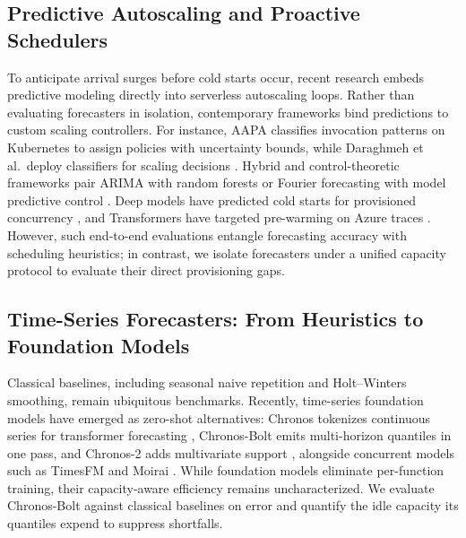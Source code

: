 \documentclass[conference,a4paper]{IEEEtran}
\begin{document}
\subsection{Predictive Autoscaling and Proactive Schedulers}
To anticipate arrival surges before cold starts occur, recent research embeds predictive modeling directly into serverless autoscaling loops. Rather than evaluating forecasters in isolation, contemporary frameworks bind predictions to custom scaling controllers. For instance, AAPA \cite{zhang2025aapa} classifies invocation patterns on Kubernetes to assign policies with uncertainty bounds, while Daraghmeh et al.\ deploy classifiers for scaling decisions \cite{daraghmeh2025scaling}. Hybrid and control-theoretic frameworks pair ARIMA with random forests \cite{shiekhani2025hybrid} or Fourier forecasting with model predictive control \cite{nguyen2025mpc}. Deep models have predicted cold starts for provisioned concurrency \cite{kumar2025coldstart}, and Transformers have targeted pre-warming on Azure traces \cite{mouen2025transformer}. However, such end-to-end evaluations entangle forecasting accuracy with scheduling heuristics; in contrast, we isolate forecasters under a unified capacity protocol to evaluate their direct provisioning gaps.

\subsection{Time-Series Forecasters: From Heuristics to Foundation Models}
Classical baselines, including seasonal naive repetition and Holt--Winters smoothing, remain ubiquitous benchmarks. Recently, time-series foundation models have emerged as zero-shot alternatives: Chronos tokenizes continuous series for transformer forecasting \cite{ansari2024chronos}, Chronos-Bolt emits multi-horizon quantiles in one pass, and Chronos-2 adds multivariate support \cite{ansari2025chronos2}, alongside concurrent models such as TimesFM \cite{das2024timesfm} and Moirai \cite{woo2024moirai}. While foundation models eliminate per-function training, their capacity-aware efficiency remains uncharacterized. We evaluate Chronos-Bolt against classical baselines on error and quantify the idle capacity its quantiles expend to suppress shortfalls.
\end{document}
